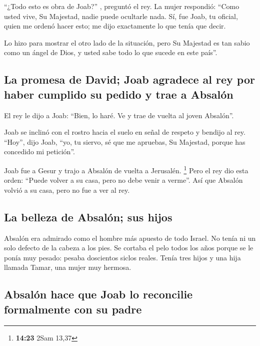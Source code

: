  ``¿Todo esto es obra de Joab?'' , preguntó el rey. La
mujer respondió: ``Como usted vive, Su Majestad, nadie puede ocultarle
nada. Sí, fue Joab, tu oficial, quien me ordenó hacer esto; me dijo
exactamente lo que tenía que decir.

 Lo hizo para mostrar el otro lado de la situación, pero
Su Majestad es tan sabio como un ángel de Dios, y usted sabe todo lo que
sucede en este país''.

\hypertarget{la-promesa-de-david-joab-agradece-al-rey-por-haber-cumplido-su-pedido-y-trae-a-absaluxf3n}{%
\subsection{La promesa de David; Joab agradece al rey por haber cumplido
su pedido y trae a
Absalón}\label{la-promesa-de-david-joab-agradece-al-rey-por-haber-cumplido-su-pedido-y-trae-a-absaluxf3n}}

 El rey le dijo a Joab: ``Bien, lo haré. Ve y trae de
vuelta al joven Absalón''.

 Joab se inclinó con el rostro hacia el suelo en señal de
respeto y bendijo al rey. ``Hoy'', dijo Joab, ``yo, tu siervo, sé que me
apruebas, Su Majestad, porque has concedido mi petición''.

 Joab fue a Gesur y trajo a Absalón de vuelta a
Jerusalén. \footnote{\textbf{14:23} 2Sam 13,37}  Pero el
rey dio esta orden: ``Puede volver a su casa, pero no debe venir a
verme''. Así que Absalón volvió a su casa, pero no fue a ver al rey.

\hypertarget{la-belleza-de-absaluxf3n-sus-hijos}{%
\subsection{La belleza de Absalón; sus
hijos}\label{la-belleza-de-absaluxf3n-sus-hijos}}

 Absalón era admirado como el hombre más apuesto de todo
Israel. No tenía ni un solo defecto de la cabeza a los pies.
 Se cortaba el pelo todos los años porque se le ponía muy
pesado: pesaba doscientos siclos reales.  Tenía tres
hijos y una hija llamada Tamar, una mujer muy hermosa.

\hypertarget{absaluxf3n-hace-que-joab-lo-reconcilie-formalmente-con-su-padre}{%
\subsection{Absalón hace que Joab lo reconcilie formalmente con su
padre}\label{absaluxf3n-hace-que-joab-lo-reconcilie-formalmente-con-su-padre}}

